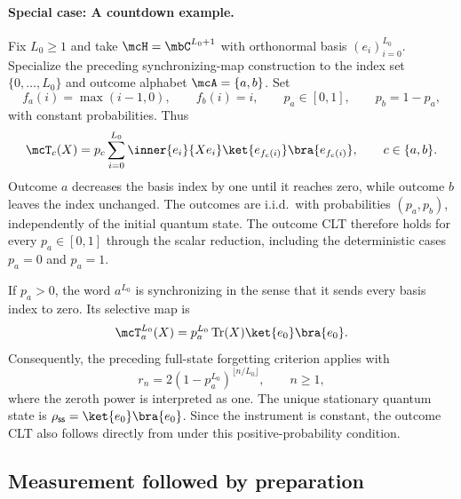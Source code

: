 \documentclass[a4paper]{article}
\numberwithin{equation}{section}   %
\theoremstyle{plain}   %
\theoremstyle{plain}   %
\theoremstyle{examplestyle}
\newcommand{\s}{\rho_{\mathsf{ss}}}     %
\begin{document}
    \paragraph{Special case: A countdown example.}
    \label{par:countdown}
        Fix $L_0\ge1$ and take $\mcH=\mbC^{L_0+1}$ with orthonormal basis $(e_i)_{i=0}^{L_0}$.
        Specialize the preceding synchronizing-map construction to the index set $\{0,\ldots,L_0\}$ and outcome alphabet $\mcA=\{a,b\}$.
        Set
        \[
             f_a(i)=\max(i-1,0),
             \qquad
             f_b(i)=i,
             \qquad
             p_a\in[0,1],
             \qquad
             p_b=1-p_a,
        \]
        with constant probabilities.
        Thus
        \[
             \mcT_c(X)
             =p_c\sum_{i=0}^{L_0}\inner{e_i}{Xe_i}
                   \ket{e_{f_c(i)}}\bra{e_{f_c(i)}},
             \qquad c\in\{a,b\}.
        \]
        Outcome $a$ decreases the basis index by one until it reaches zero, while outcome $b$ leaves the index unchanged.
        The outcomes are i.i.d.\ with probabilities $(p_a,p_b)$, independently of the initial quantum state.
        The outcome CLT therefore holds for every $p_a\in[0,1]$ through the scalar reduction, including the deterministic cases $p_a=0$ and $p_a=1$.
        
        If $p_a>0$, the word $a^{L_0}$ is synchronizing in the sense that it sends every basis index to zero.
        Its selective map is
        \[
             \mcT_a^{L_0}(X)
             =p_a^{L_0}\operatorname{Tr}(X)
                   \ket{e_0}\bra{e_0}.
        \]
        Consequently, the preceding full-state forgetting criterion applies with
        \[
             r_n=2(1-p_a^{L_0})^{\lfloor n/L_0\rfloor},
         \qquad n\ge1,
        \]
        where the zeroth power is interpreted as one.
        The unique stationary quantum state is $\s=\ket{e_0}\bra{e_0}$.
        Since the instrument is constant, the outcome CLT also follows directly from  under this positive-probability condition.


\subsection{Measurement followed by preparation}
\label{subsec:unified:prepare}

\end{document}
